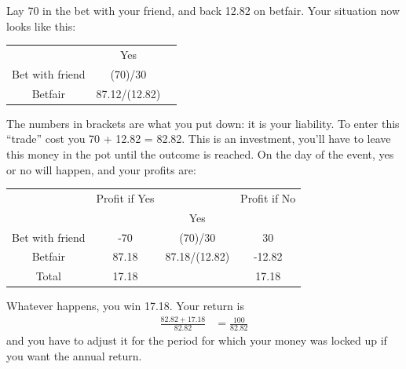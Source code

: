 \documentclass[a4paper]{article}
\begin{document}
Lay 70 in the bet with your friend, and back 12.82 on betfair.
Your situation now looks like this:
\begin{center}
\begin{tabular}{ccc}
\hline
                   &     Yes           &  \\
Bet with friend    &   (70)/30         &  \\
Betfair            &   87.12/(12.82)   &  \\
\hline
\end{tabular}
\end{center}
The numbers in brackets are what you put down: it is your liability.
To enter this ``trade'' cost you 70 + 12.82 = 82.82.
This is an investment, you'll have to leave this money in the pot until the outcome is reached.
On the day of the event, yes or no will happen, and your profits are:
\begin{center}
\begin{tabular}{cc|c|c}
\hline
                  &  Profit if Yes &                   & Profit if No  \\
                  &                &      Yes          &               \\
Bet with friend   &  -70           &   (70)/30         &  30           \\
Betfair           &   87.18        &   87.18/(12.82)   &  -12.82       \\
\hline
Total             &   17.18        &                   &  17.18       \\
\hline
\end{tabular}
\end{center}

Whatever happens, you win 17.18. Your return is
\begin{align*}
 \frac{82.82 + 17.18}{82.82}
 &=
 \frac{100}{82.82}
\end{align*}
and you have to adjust it for the period for which your money was locked up if you want the annual return.
\end{document}
